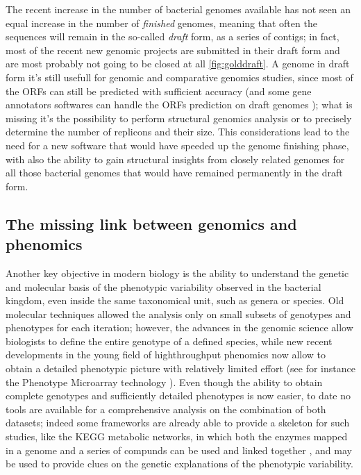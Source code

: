The recent increase in the number of bacterial genomes available has not seen an equal increase in the number of \textit{finished} genomes, meaning that often the sequences will remain in the so-called \textit{draft} form, as a series of contigs; in fact, most of the recent new genomic projects are submitted in their draft form and are most probably not going to be closed at all \ref{fig:golddraft}. A genome in draft form it's still usefull for genomic and comparative genomics studies, since most of the ORFs can still be predicted with sufficient accuracy (and some gene annotators softwares can handle the ORFs prediction on draft genomes \cite{hyatt2010prodigal}); what is missing it's the possibility to perform structural genomics analysis or to precisely determine the number of replicons and their size. This considerations lead to the need for a new software that would have speeded up the genome finishing phase, with also the ability to gain structural insights from closely related genomes for all those bacterial genomes that would have remained permanently in the draft form.

\subsection{The missing link between genomics and phenomics}
Another key objective in modern biology is the ability to understand the genetic and molecular basis of the phenotypic variability observed in the bacterial kingdom, even inside the same taxonomical unit, such as genera or species. Old molecular techniques allowed the analysis only on small subsets of genotypes and phenotypes for each iteration; however, the advances in the genomic science allow biologists to define the entire genotype of a defined species, while new recent developments in the young field of highthroughput phenomics now allow to obtain a detailed phenotypic picture with relatively limited effort (see for instance the Phenotype Microarray technology \cite{biologPM}). Even though the ability to obtain complete genotypes and sufficiently detailed phenotypes is now easier, to date no tools are available for a comprehensive analysis on the combination of both datasets; indeed some frameworks are already able to provide a skeleton for such studies, like the KEGG metabolic networks, in which both the enzymes mapped in a genome and a series of compunds can be used and linked together \cite{ogata1999kegg}, and may be used to provide clues on the genetic explanations of the phenotypic variability.

